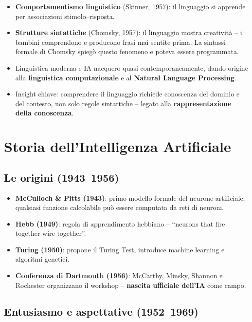 \begin{itemize}
    \item \textbf{Comportamentismo linguistico} (Skinner, 1957): il linguaggio si apprende per associazioni stimolo--risposta.
    \item \textbf{Strutture sintattiche} (Chomsky, 1957): il linguaggio mostra creativit\`a -- i bambini comprendono e producono frasi mai sentite prima. La sintassi formale di Chomsky spieg\`o questo fenomeno e poteva essere programmata.
    \item Linguistica moderna e IA nacquero quasi contemporaneamente, dando origine alla \textbf{linguistica computazionale} e al \textbf{Natural Language Processing}.
    \item Insight chiave: comprendere il linguaggio richiede conoscenza del dominio e del contesto, non solo regole sintattiche -- legato alla \textbf{rappresentazione della conoscenza}.
\end{itemize}


\section{Storia dell'Intelligenza Artificiale}


\subsection{Le origini (1943--1956)}

\begin{itemize}
    \item \textbf{McCulloch \& Pitts (1943)}: primo modello formale del neurone artificiale; qualsiasi funzione calcolabile pu\`o essere computata da reti di neuroni.
    \item \textbf{Hebb (1949)}: regola di apprendimento hebbiano -- ``neurons that fire together wire together''.
    \item \textbf{Turing (1950)}: propone il Turing Test, introduce machine learning e algoritmi genetici.
    \item \textbf{Conferenza di Dartmouth (1956)}: McCarthy, Minsky, Shannon e Rochester organizzano il workshop -- \textbf{nascita ufficiale dell'IA} come campo.
\end{itemize}

\subsection{Entusiasmo e aspettative (1952--1969)}

